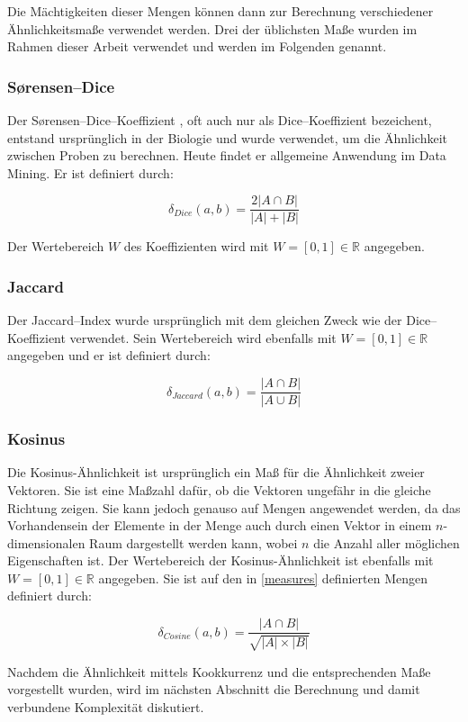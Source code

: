 Die Mächtigkeiten dieser Mengen können dann zur Berechnung verschiedener Ähnlichkeitsmaße verwendet werden. Drei der üblichsten Maße wurden im Rahmen dieser Arbeit verwendet und werden im Folgenden genannt.

\subsubsection{Sørensen--Dice}

Der Sørensen--Dice--Koeffizient \cite{st1948} \cite{ld1945}, oft auch nur als Dice--Koeffizient bezeichent, entstand ursprünglich in der Biologie und wurde verwendet, um die Ähnlichkeit zwischen Proben zu berechnen. Heute findet er allgemeine Anwendung im Data Mining. Er ist definiert durch:

\[
\delta_{Dice}(a, b) = \frac{2|A \cap B|}{|A|+|B|}
\]

Der Wertebereich \(W\) des Koeffizienten wird mit \(W=[0,1] \in \mathbb{R}\) angegeben.

\subsubsection{Jaccard}

Der Jaccard--Index \cite{pj19012} wurde ursprünglich mit dem gleichen Zweck wie der Dice--Koeffizient verwendet. Sein Wertebereich wird ebenfalls mit \(W=[0,1] \in \mathbb{R}\) angegeben und er ist definiert durch:

\[
\delta_{Jaccard}(a,b) = \frac{|A \cap B|}{|A \cup B|}
\]

\subsubsection{Kosinus}

Die Kosinus-Ähnlichkeit \cite{hkp2012} ist ursprünglich ein Maß für die Ähnlichkeit zweier Vektoren. Sie ist eine Maßzahl dafür, ob die Vektoren ungefähr in die gleiche Richtung zeigen. Sie kann jedoch genauso auf Mengen angewendet werden, da das Vorhandensein der Elemente in der Menge auch durch einen Vektor in einem \(n\)-dimensionalen Raum dargestellt werden kann, wobei \(n\) die Anzahl aller möglichen Eigenschaften ist. Der Wertebereich der Kosinus-Ähnlichkeit ist ebenfalls mit \(W=[0,1] \in \mathbb{R}\) angegeben. Sie ist auf den in \cref{measures} definierten Mengen definiert durch:

\[
\delta_{Cosine}(a, b) = \frac{|A \cap B|}{\sqrt{|A| \times |B|}}
\]

Nachdem die Ähnlichkeit mittels Kookkurrenz und die entsprechenden Maße vorgestellt wurden, wird im nächsten Abschnitt die Berechnung und damit verbundene Komplexität diskutiert.

